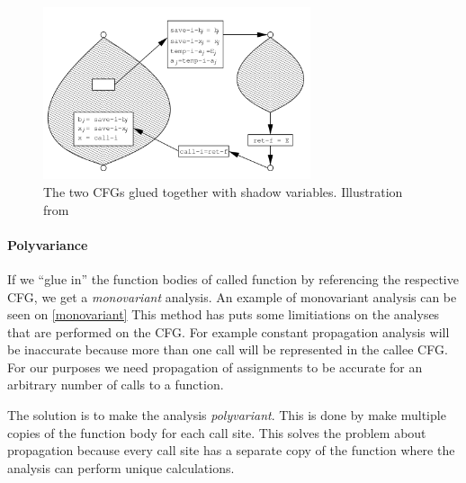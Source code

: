 \begin{figure}[H]
  \center
  \includegraphics[width=0.7\textwidth]{figures/interprocedural_glue}
  \caption{The two CFGs glued together with shadow variables. Illustration from \citet[p.~38]{schwartzbach}}
  \label{interprocedural_glue}
\end{figure}

\paragraph{Polyvariance}
If we ``glue in'' the function bodies of called function by referencing the respective CFG, we get a \emph{monovariant} analysis.
An example of monovariant analysis can be seen on \cref{monovariant}
This method has puts some limitiations on the analyses that are performed on the CFG.
For example constant propagation analysis will be inaccurate because more than one call will be represented in the callee CFG.
For our purposes we need propagation of assignments to be accurate for an arbitrary number of calls to a function.

The solution is to make the analysis \emph{polyvariant}.
This is done by make multiple copies of the function body for each call site.
This solves the problem about propagation because every call site has a separate copy of the function where the analysis can perform unique calculations.

